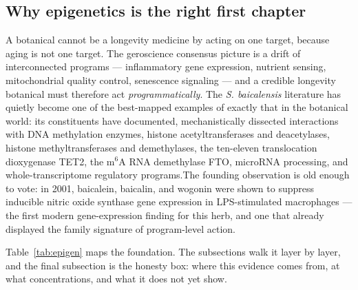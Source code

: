 \documentclass[11pt]{article}
\newcommand{\src}[1]{\allowbreak[#1]}
\begin{document}
\subsection{Why epigenetics is the right first chapter}

A botanical cannot be a longevity medicine by acting on one target, because aging is not one target. The geroscience consensus picture is a drift of interconnected programs --- inflammatory gene expression, nutrient sensing, mitochondrial quality control, senescence signaling --- and a credible longevity botanical must therefore act \textit{programmatically}. The \textit{S. baicalensis} literature has quietly become one of the best-mapped examples of exactly that in the botanical world: its constituents have documented, mechanistically dissected interactions with DNA methylation enzymes, histone acetyltransferases and deacetylases, histone methyltransferases and demethylases, the ten-eleven translocation dioxygenase TET2, the m$^6$A RNA demethylase FTO, microRNA processing, and whole-transcriptome regulatory programs.\src{142}\src{143}\src{156}\src{153} The founding observation is old enough to vote: in 2001, baicalein, baicalin, and wogonin were shown to suppress inducible nitric oxide synthase gene expression in LPS-stimulated macrophages --- the first modern gene-expression finding for this herb, and one that already displayed the family signature of program-level action.\src{105}

Table~\ref{tab:epigen} maps the foundation. The subsections walk it layer by layer, and the final subsection is the honesty box: where this evidence comes from, at what concentrations, and what it does not yet show.
\end{document}
